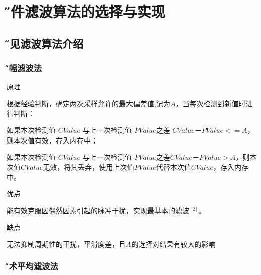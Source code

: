 \documentclass[12pt,a4paper]{article} %
\newcommand{\xiaosanhao}{\fontsize{15pt}{\baselineskip}\selectfont}    %
\begin{document}
		



\newpage
 \section{\xiaosanhao \H  软件滤波算法的选择与实现}
 
 
 	\subsection{\H 常见滤波算法介绍}
 	
 		\subsubsection{\H 限幅滤波法} 
 		\begin{compactitem} 
 			\item 原理
 			\par 根据经验判断，确定两次采样允许的最大偏差值,记为$A$，当每次检测到新值时进行判断：
 			\par 如果本次检测值  $CValue$ 与上一次检测值 $PValue $之差 $CValue－PValue <= A$，则本次值有效，存入内存中；
 			\par 如果本次检测值  $CValue$ 与上一次检测值 $PValue $之差$CValue－PValue >A$，则本次值$CValue$无效，将其丢弃，使用上次值$PValue $代替本次值$CValue$，存入内存中。
			
			\item 优点
			\par 能有效克服因偶然因素引起的脉冲干扰，实现最基本的滤波$^{[2]}$。
			
			\item 缺点
			\par 无法抑制周期性的干扰，平滑度差，且$A$的选择对结果有较大的影响
			
		 \end{compactitem}	
		 
 		\subsubsection{\H 算术平均滤波法} 
 		
\end{document}
